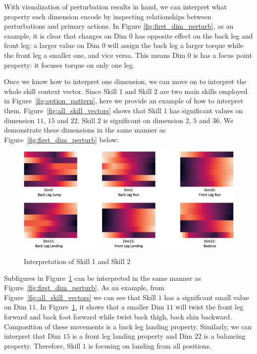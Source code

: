 With visualization of perturbation results in hand, we can
interpret what property each dimension encode by inspecting
relationships between perturbations and primary actions. In
Figure \ref{fig:first_dim_perturb}, as an example, it is clear
that changes on Dim $0$ has opposite effect on the back leg and
front leg: a larger value on Dim $0$ will assign the back leg a
larger torque while the front leg a smaller one, and vice versa.
This means Dim $0$ is has a focus point property: it focuses
torque on only one leg.

Once we know how to interpret one dimension, we can move on to
interpret the whole skill context vector. Since Skill $1$ and
Skill $2$ are two main skills employed in
Figure~\ref{fig:option_pattern}, here we provide an example of
how to interpret them. Figure~\ref{fig:all_skill_vectors} shows
that Skill $1$ has significant values on dimension $11$, $15$ and
$22$. Skill $2$ is significant on dimension $2$, $5$ and $36$. We
demonstrate these dimensions in the same manner as
Figure~\ref{fig:first_dim_perturb} below:
\begin{figure}[thb]
  \centering
  \includegraphics[width=1\linewidth]{./Part1/figures/interp_2_skills.png}\\
  \caption{\label{fig:interp_skill} Interpretation of Skill 1
    and Skill 2}
\end{figure}

Subfigures in Figure~\ref{fig:interp_skill} can be interpreted in
the same manner as Figure~\ref{fig:first_dim_perturb}. As an
example, from Figure~\ref{fig:all_skill_vectors} we can see that
Skill $1$ has a significant small value on Dim $11$. In
Figure~\ref{fig:interp_skill}, it shows that a smaller Dim $11$
will twist the front leg forward and back foot forward while
twist back thigh, back shin backward. Composition of these
movements is a back leg landing property. Similarly, we can
interpret that Dim $15$ is a front leg landing property and Dim
$22$ is a balancing property. Therefore, Skill $1$ is focusing on
landing from all positions.

